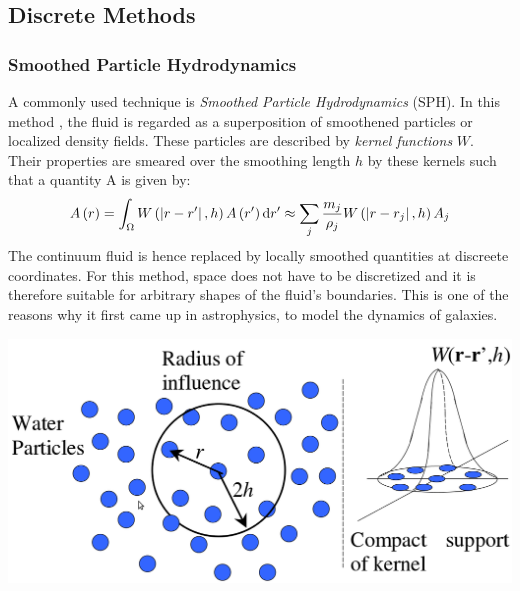 \subsection{Discrete Methods}





\subsubsection*{Smoothed Particle Hydrodynamics}


A commonly used technique is \emph{Smoothed Particle Hydrodynamics} (SPH). In this method \citep{sph1,sph2}, the fluid is regarded as a superposition of smoothened particles or localized density fields. These particles are described by \emph{kernel functions} $W$. Their properties are smeared over the smoothing length $h$ by these kernels such that a quantity A is given by:
\begin{equation}
A\left(r\right) 
= \int_\Omega{W\ensuremath{\left(\left|r-r'\right|,h\right)} A\ensuremath{\left(r'\right)} \text{d}r'}
\approx \sum_j{\frac{m_j}{\rho_j} W\left(\left|r-r_j\right|,h\right) A_j}
\end{equation}
The continuum fluid is hence replaced by locally smoothed quantities at discreete coordinates. For this method, space does not have to be discretized and it is therefore suitable for arbitrary shapes of the fluid's boundaries. This is one of the reasons why it first came up in astrophysics, to model the dynamics of galaxies.

\begin{minipage}{.9\textwidth}
  \begin{minipage}{\textwidth}
    \centering
    \includegraphics[width=.8\textwidth]{pics/sph1.png}
    \label{fig:sph1}
  \end{minipage}
\hfill
  \begin{minipage}{0.1\textwidth}
\,
  \end{minipage}
\end{minipage}
\vspace{0.2cm}

